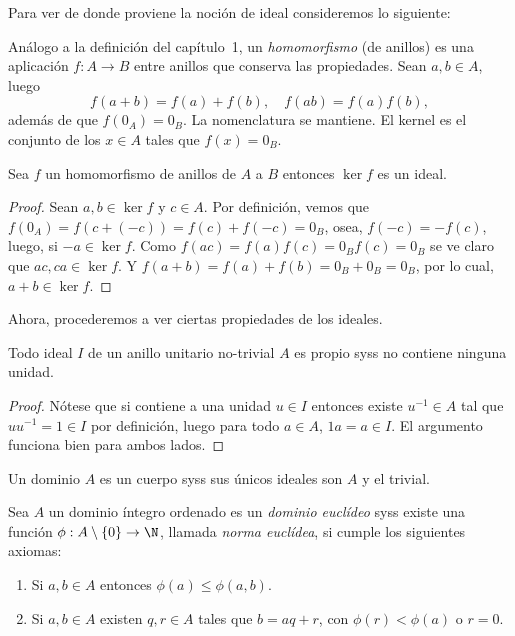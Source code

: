 \documentclass[11pt,oneside]{book}
\begin{document}
Para ver de donde proviene la noción de ideal consideremos lo siguiente:
\begin{mydef}
Análogo a la definición del capítulo~1, un \textit{homomorfismo} (de anillos) es una aplicación $f:A\rightarrow B$ entre anillos que conserva las propiedades. Sean $a,b\in A$, luego
$$f(a+b)=f(a)+f(b),\quad f(ab)=f(a)f(b),$$
además de que $f(0_A)=0_B$. La nomenclatura se mantiene. El kernel es el conjunto de los $x\in A$ tales que $f(x)=0_B$.
\end{mydef}
\begin{thm}
Sea $f$ un homomorfismo de anillos de $A$ a $B$ entonces $\ker f$ es un ideal.
\end{thm}
\begin{proof}
Sean $a,b\in\ker f$ y $c\in A$. Por definición, vemos que $f(0_A)=f(c+(-c))=f(c)+f(-c)=0_B$, osea, $f(-c)=-f(c)$, luego, si $-a\in\ker f$. Como $f(ac)=f(a)f(c)=0_Bf(c)=0_B$ se ve claro que $ac,ca\in\ker f$. Y $f(a+b)=f(a)+f(b)=0_B+0_B=0_B$, por lo cual, $a+b\in\ker f$.
\end{proof}
Ahora, procederemos a ver ciertas propiedades de los ideales.
\begin{prop}
Todo ideal $I$ de un anillo unitario no-trivial $A$ es propio syss no contiene ninguna unidad.
\end{prop}
\begin{proof}
Nótese que si contiene a una unidad $u\in I$ entonces existe $u^{-1}\in A$ tal que $uu^{-1}=1\in I$ por definición, luego para todo $a\in A$, $1a=a\in I$. El argumento funciona bien para ambos lados.
\end{proof}
\begin{cor}\label{thm:dip-field}
Un dominio $A$ es un cuerpo syss sus únicos ideales son $A$ y el trivial.
\end{cor}
\begin{mydef}
Sea $A$ un dominio íntegro ordenado es un \textit{dominio euclídeo} syss existe una función $\phi:A\setminus\{0\}\rightarrow\N$, llamada \textit{norma euclídea}, si cumple los siguientes axiomas:
\begin{enumerate}
\item Si $a,b\in A$ entonces $\phi(a)\leq\phi(a,b)$.
\item Si $a,b\in A$ existen $q,r\in A$ tales que $b=aq+r$, con $\phi(r)\lt\phi(a)$ o $r=0$.
\end{enumerate}
\end{mydef}
\end{document}
